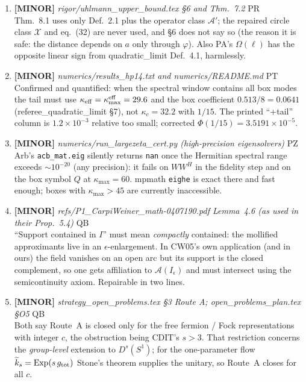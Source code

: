 \documentclass[11pt]{article}
\begin{document}
\begin{enumerate}[leftmargin=1.6em,itemsep=6pt]
\item \textbf{[MINOR]} \emph{rigor/uhlmann\_upper\_bound.tex \S6 and Thm.~7.2} \hfill\textsc{PR}\\ Thm.~8.1 uses only Def.~2.1 plus the operator class \(\mathcal A'\); the repaired circle class \(\mathcal X\) and eq.~(32) are never used, and \S6 does not say so (the reason it is safe: the distance depends on \(a\) only through \(\varphi\)). Also PA's \(\Omega(\ell)\) has the opposite linear sign from quadratic\_limit Def.~4.1, harmlessly.
\item \textbf{[MINOR]} \emph{numerics/results\_hp14.txt and numerics/README.md} \hfill\textsc{PT}\\ Confirmed and quantified: when the spectral window contains all box modes the tail must use \(\kappa_{\rm eff}=\kappa_{\max}^{\rm eff}=29.6\) and the box coefficient \(0.513/8=0.0641\) (referee\_quadratic\_limit \S7), not \(\kappa_c=32.2\) with \(1/15\). The printed ``+tail'' column is \(1.2\times10^{-3}\) relative too small; corrected \(\Phi(1/15)=3.5191\times10^{-5}\).
\item \textbf{[MINOR]} \emph{numerics/run\_largezeta\_cert.py (high-precision eigensolvers)} \hfill\textsc{PZ}\\ Arb's \texttt{acb\_mat.eig} silently returns \texttt{nan} once the Hermitian spectral range exceeds \(\sim10^{-20}\) (any precision): it fails on \(WW^{H}\) in the fidelity step and on the box symbol \(Q\) at \(\kappa_{\max}=60\). mpmath \texttt{eighe} is exact there and fast enough; boxes with \(\kappa_{\max}>45\) are currently inaccessible.
\item \textbf{[MINOR]} \emph{refs/P1\_CarpiWeiner\_math-0407190.pdf Lemma~4.6 (as used in their Prop.~5.4)} \hfill\textsc{QB}\\ ``Support contained in \(I\)'' must mean \emph{compactly} contained: the mollified approximants live in an \(\epsilon\)-enlargement. In CW05's own application (and in ours) the field vanishes on an open arc but its support is the closed complement, so one gets affiliation to \(\mathcal A(I_\epsilon)\) and must intersect using the semicontinuity axiom. Repairable in two lines.
\item \textbf{[MINOR]} \emph{strategy\_open\_problems.tex \S3 Route A; open\_problems\_plan.tex \S O5} \hfill\textsc{QB}\\ Both say Route~A is closed only for the free fermion / Fock representations with integer \(c\), the obstruction being CDIT's \(s>3\). That restriction concerns the \emph{group-level} extension to \(D^s(S^1)\); for the one-parameter flow \(\widetilde k_s=\mathrm{Exp}(s\,g_{\rm tot})\) Stone's theorem supplies the unitary, so Route~A closes for all \(c\).

\end{enumerate}
\end{document}
